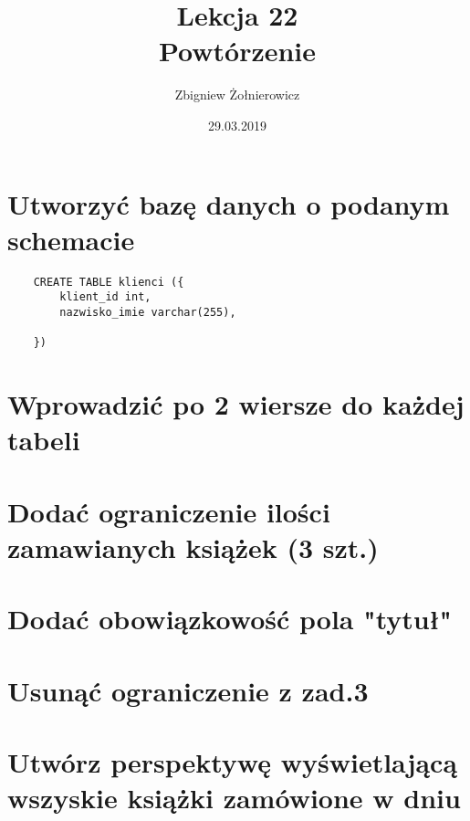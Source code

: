 \documentclass{article}
\begin{document}
\title{{\huge Lekcja 22} \\
{\large Powtórzenie}}
\author{Zbigniew Żołnierowicz}
\date{29.03.2019}
\maketitle

\section{Utworzyć bazę danych o podanym schemacie}

\begin{verbatim}
    CREATE TABLE klienci ({
        klient_id int,
        nazwisko_imie varchar(255),

    })
\end{verbatim}

\section{Wprowadzić po 2 wiersze do każdej tabeli}

\section{Dodać ograniczenie ilości zamawianych książek (3 szt.)}

\section{Dodać obowiązkowość pola "tytuł"}

\section{Usunąć ograniczenie z zad.\@ 3}

\section{Utwórz perspektywę wyświetlającą wszyskie książki zamówione w dniu}
\end{document}
